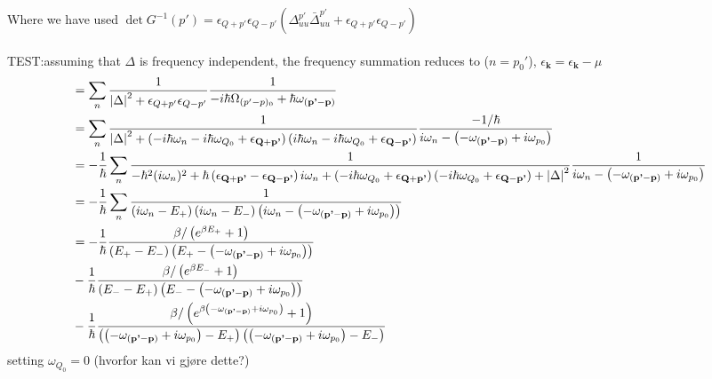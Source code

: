 \documentclass{article}
\begin{document}
Where we have used $\det{G^{-1}}(p') = \epsilon_{Q+p'} \epsilon_{Q-p'} \left( \Delta^{p'}_{uu} \bar{\Delta}^{p'}_{uu} + \epsilon_{Q+p'} \epsilon_{Q-p'}\right)$
\\
\\
TEST:assuming that $\Delta$ is frequency independent, the frequency summation reduces to ($n = p_0'$), $\epsilon_{\textbf{k}} = \epsilon_{\textbf{k}} - \mu$
\begin{align}
         &=  \sum_{n} \frac{1}{\abs{\Delta}^2 + \epsilon_{Q+p'} \epsilon_{Q-p'}} \frac{1}{-i\hbar\Omega_{(p'-p)_0} + \hbar \omega_{(\textbf{p'} - \textbf{p})}} \\
         &=  \sum_{n} \frac{1}{\abs{\Delta}^2 + \left(-i\hbar\omega_n - i \hbar \omega_{Q_0} + \epsilon_{\textbf{Q} + \textbf{p'}}\right) \left(i\hbar\omega_n - i \hbar \omega_{Q_0} + \epsilon_{\textbf{Q} - \textbf{p'}}\right)} \frac{-1/\hbar}{i\omega_{n} - \left(-\omega_{(\textbf{p'} - \textbf{p})}+ i\omega_{p_0}\right)} \\
         &=  -\frac{1}{\hbar}\sum_{n} \frac{1}{-\hbar^2 (i \omega_n)^2 + \hbar\left(\epsilon_{\textbf{Q} + \textbf{p'}} - \epsilon_{\textbf{Q} - \textbf{p'}}\right)i\omega_n +\left(- i \hbar \omega_{Q_0} + \epsilon_{\textbf{Q} + \textbf{p'}}\right)\left(- i \hbar \omega_{Q_0} + \epsilon_{\textbf{Q} - \textbf{p'}}\right) + \abs{\Delta}^2} \frac{1}{i\omega_{n} - \left(-\omega_{(\textbf{p'} - \textbf{p})}+ i\omega_{p_0}\right)}\\
         &= -\frac{1}{\hbar} \sum_{n} \frac{1}{\left(i\omega_n - E_+\right)\left(i\omega_n - E_-\right)\left(i\omega_{n} - \left(-\omega_{(\textbf{p'} - \textbf{p})}+ i\omega_{p_0}\right)\right)} \\
         &= -\frac{1}{\hbar} \frac{\beta / \left( e^{\beta E_+} + 1\right)}{\left(E_+ - E_-\right)\left(E_+ - \left(-\omega_{(\textbf{p'} - \textbf{p})}+ i\omega_{p_0}\right)\right)} \\
         &  -\frac{1}{\hbar} \frac{\beta / \left( e^{\beta E_-} + 1\right)}{\left(E_- - E_+\right)\left(E_- - \left(-\omega_{(\textbf{p'} - \textbf{p})}+ i\omega_{p_0}\right)\right)} \\
         &  -\frac{1}{\hbar} \frac{\beta / \left( e^{\beta \left(-\omega_{(\textbf{p'} - \textbf{p})}+ i\omega_{p_0}\right)} + 1\right)}{\left(\left(-\omega_{(\textbf{p'} - \textbf{p})}+ i\omega_{p_0}\right) - E_+\right)\left(\left(-\omega_{(\textbf{p'} - \textbf{p})}+ i\omega_{p_0}\right) - E_-\right)}
\end{align}
setting $\omega_{Q_0} = 0$ (hvorfor kan vi gjøre dette?)
\end{document}
